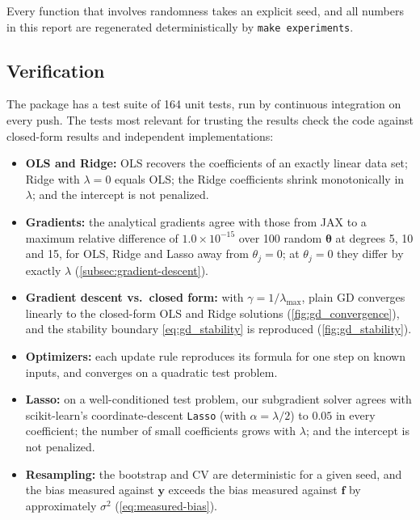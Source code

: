 Every function that involves
randomness takes an explicit seed, and all numbers in this report are
regenerated deterministically by \texttt{make experiments}.

\subsection{Verification}
\label{subsec:verification}

The package has a test suite of 164 unit tests, run by continuous integration on every push. The tests
most relevant for trusting the results check the code against closed-form
results and independent implementations:

\begin{itemize}
    \item \textbf{OLS and Ridge:} OLS recovers the coefficients of an exactly
    linear data set; Ridge with $\lambda=0$ equals OLS; the Ridge coefficients
    shrink monotonically in $\lambda$; and the intercept is not penalized.
    \item \textbf{Gradients:} the analytical gradients agree with those from
    JAX to a maximum relative difference of $1.0\times10^{-15}$ over 100 random
    $\bm{\theta}$ at degrees 5, 10 and 15, for OLS, Ridge and Lasso away from
    $\theta_j = 0$; at $\theta_j=0$ they differ by exactly $\lambda$
    (\cref{subsec:gradient-descent}).
    \item \textbf{Gradient descent vs.\ closed form:} with $\gamma=1/\lambda_{\max}$, plain GD
    converges linearly to the closed-form OLS and Ridge solutions
    (\cref{fig:gd_convergence}), and the stability boundary
    \cref{eq:gd_stability} is reproduced (\cref{fig:gd_stability}).
    \item \textbf{Optimizers:} each update rule reproduces its formula for
    one step on known inputs, and converges on a quadratic test problem.
    \item \textbf{Lasso:} on a well-conditioned test problem, our
    subgradient solver agrees with scikit-learn's coordinate-descent
    \texttt{Lasso} (with $\alpha = \lambda/2$) to $0.05$ in every coefficient;
    the number of small coefficients grows with $\lambda$; and the intercept is
    not penalized.
    \item \textbf{Resampling:} the bootstrap and CV are deterministic for a
    given seed, and the bias measured against $\bm{y}$ exceeds the bias
    measured against $\bm{f}$ by approximately $\sigma^2$
    (\cref{eq:measured-bias}).
\end{itemize}
